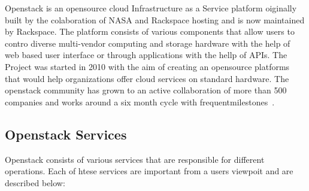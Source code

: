 Openstack is an opensource cloud Infrastructure as a Service platform
oiginally built by the colaboration of NASA and Rackspace hosting and
is now maintained by Rackspace. The platform consists of various
components that allow users to contro diverse multi-vendor computing
and storage hardware with the help of web based user interface or
through applications with the hellp of APIs.
The Project was started in 2010 with the aim of creating an opensource
platforms that would help organizations offer cloud services on
standard hardware. The openstack community has grown to an active
collaboration of more than 500 companies and works around a six month
cycle with frequentmilestones~\cite{hid-sp18-503-openstack-wiki}.

\subsection{Openstack Services}
Openstack consists of various services that are responsible for
different operations. Each of htese services are important from a
users viewpoit and are described below:

